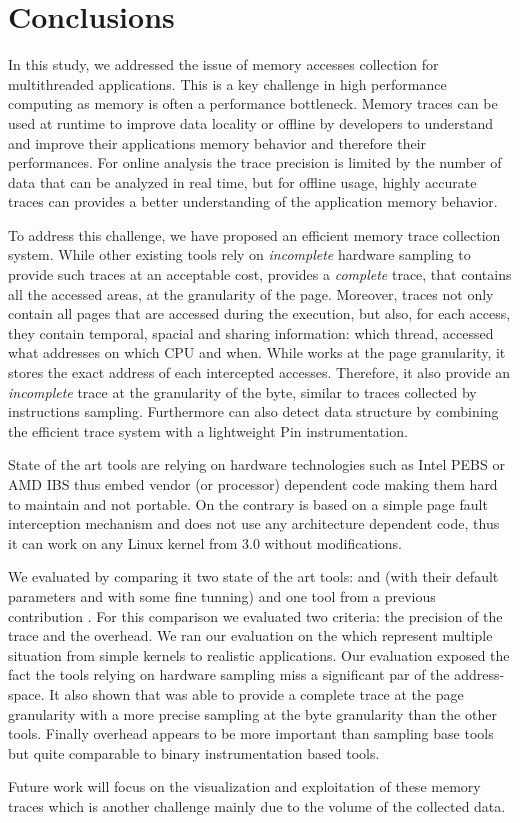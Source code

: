 \section{Conclusions}
\label{sec:cncl}

In this study, we addressed the issue of memory accesses collection for
multithreaded applications. This is a key challenge in high performance
computing as memory is often a performance
bottleneck. Memory traces can be used at runtime to improve data locality or
offline by developers to understand and improve their applications memory
behavior and therefore their performances. For online analysis the trace precision
is limited by the number of data that can be analyzed in real time, but for
offline usage, highly accurate traces can provides a better understanding of
the application memory behavior.

To address this challenge, we have proposed \Moca an efficient memory trace
collection system. While other existing tools
rely on \emph{incomplete} hardware sampling to
provide such traces at an acceptable cost, \Moca provides a \emph{complete}
trace, that contains all the accessed areas, at the granularity of the page.
Moreover, \Moca traces not only
contain all pages that are accessed during the execution, but also, 
for each access, they contain temporal, spacial and sharing
information: which thread, accessed what addresses on which CPU and when.
While \Moca works at the page granularity, it stores the exact
address of each intercepted accesses. Therefore, it also provide an
\emph{incomplete} trace at the granularity of the byte, similar to
traces collected by instructions sampling. Furthermore \Moca can also detect
data structure by combining the efficient trace system with a lightweight Pin
instrumentation.

State of the art tools are relying on hardware technologies such as Intel PEBS
or AMD IBS thus embed vendor (or processor) dependent code making them hard
to maintain and not portable. On the contrary \Moca is based on a simple page
fault interception mechanism and does not use any architecture dependent code,
thus it can work on any Linux kernel from $3.0$ without modifications.

We evaluated \Moca by comparing it two state of the art tools: \Mitos and
\MemProf (with their default parameters and with some fine tunning) and one
tool from a previous contribution \TABARNAC. For this comparison we evaluated
two criteria: the precision of the trace and the overhead. We ran our
evaluation on the \NPB which represent multiple situation from simple kernels
to realistic applications. Our evaluation exposed the fact the tools
relying on hardware sampling miss a significant par of the address-space. It
also shown that \Moca was able to provide a complete trace at the page
granularity with a more precise sampling at the byte granularity than the
other tools. Finally \Moca overhead appears to be more important than sampling
base tools but quite comparable to binary instrumentation  based tools.

Future work will focus on the visualization and exploitation of these memory traces
which is another challenge mainly due to the volume of the collected data.
